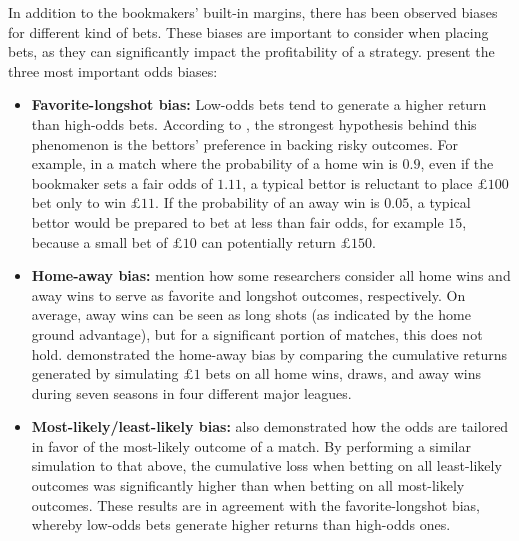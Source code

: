 In addition to the bookmakers' built-in margins, there has been observed biases for different kind of bets. These biases are important to consider when placing bets, as they can significantly impact the profitability of a strategy. \citet{bib:constantinou-fenton-2013} present the three most important odds biases:
\begin{itemize}
    \item \textbf{Favorite-longshot bias:} Low-odds bets tend to generate a higher return than high-odds bets. According to \citet{bib:constantinou-fenton-2013}, the strongest hypothesis behind this phenomenon is the bettors' preference in backing risky outcomes. For example, in a match where the probability of a home win is $0.9$, even if the bookmaker sets a fair odds of $1.11$, a typical bettor is reluctant to place $\pounds 100$ bet only to win $\pounds 11$. If the probability of an away win is $0.05$, a typical bettor would be prepared to bet at less than fair odds, for example $15$, because a small bet of $\pounds 10$ can potentially return $\pounds 150$. 
    
    \item \textbf{Home-away bias:} \citet{bib:constantinou-fenton-2013} mention how some researchers consider all home wins and away wins to serve as favorite and longshot outcomes, respectively. On average, away wins can be seen as long shots (as indicated by the home ground advantage), but for a significant portion of matches, this does not hold. \citet{bib:constantinou-fenton-2013} demonstrated the home-away bias by comparing the cumulative returns generated by simulating $\pounds 1$ bets on all home wins, draws, and away wins during seven seasons in four different major leagues.
    
    \item \textbf{Most-likely/least-likely bias:} \citet{bib:constantinou-fenton-2013} also demonstrated how the odds are tailored in favor of the most-likely outcome of a match. By performing a similar simulation to that above, the cumulative loss when betting on all least-likely outcomes was significantly higher than when betting on all most-likely outcomes. These results are in agreement with the favorite-longshot bias, whereby low-odds bets generate higher returns than high-odds ones.
\end{itemize}